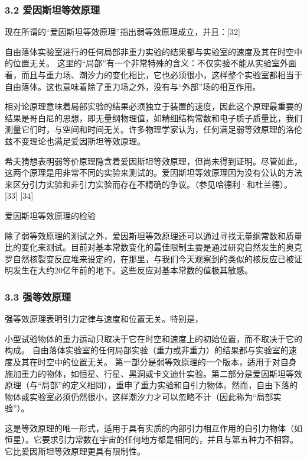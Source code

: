 \subsubsection{3.2 爱因斯坦等效原理}

现在所谓的“爱因斯坦等效原理”指出弱等效原理成立，并且：[32]

自由落体实验室进行的任何局部非重力实验的结果都与实验室的速度及其在时空中的位置无关。
这里的“局部”有一个非常特殊的含义：不仅实验不能从实验室外面看，而且与重力场、潮汐力的变化相比，它也必须很小，这样整个实验室都相当于自由落体。这也意味着除了重力场之外，没有与“外部”场的相互作用。

相对论原理意味着局部实验的结果必须独立于装置的速度，因此这个原理最重要的结果是哥白尼的思想，即无量纲物理值，如精细结构常数和电子质子质量比，我们测量它们时，与空间和时间无关。许多物理学家认为，任何满足弱等效原理的洛伦兹不变理论也满足爱因斯坦等效原理。

希夫猜想表明弱等价原理隐含着爱因斯坦等效原理，但尚未得到证明。尽管如此，这两个原理是用非常不同的实验来测试的。爱因斯坦等效原理因为没有公认的方法来区分引力实验和非引力实验而存在不精确的争议。（参见哈德利·和杜兰德）。[33] [34]


\textbf{}{爱因斯坦等效原理的检验}

除了弱等效原理的测试之外，爱因斯坦等效原理还可以通过寻找无量纲常数和质量比的变化来测试。目前对基本常数变化的最佳限制主要是通过研究自然发生的奥克罗自然核裂变反应堆来设定的，在那里，与我们今天观察到的类似的核反应已被证明发生在大约20亿年前的地下。这些反应对基本常数的值极其敏感。




\subsubsection{3.3 强等效原理}

强等效原理表明引力定律与速度和位置无关。特别是，

小型试验物体的重力运动只取决于它在时空和速度上的初始位置，而不取决于它的构成。
自由落体实验室的任何局部实验（重力或非重力）的结果都与实验室的速度及其在时空中的位置无关。
第一部分是弱等效原理的一个版本，适用于对自身施加重力的物体，如恒星、行星、黑洞或卡文迪什实验。第二部分是爱因斯坦等效原理（与“局部”的定义相同），重申了重力实验和自引力物体。然而，自由下落的物体或实验室必须仍然很小，这样潮汐力才可以忽略不计（因此称为“局部实验”）。

这是等效原理的唯一形式，适用于具有实质的内部引力相互作用的自引力物体（如恒星）。它要求引力常数在宇宙的任何地方都是相同的，并且与第五种力不相容。它比爱因斯坦等效原理更具有限制性。


